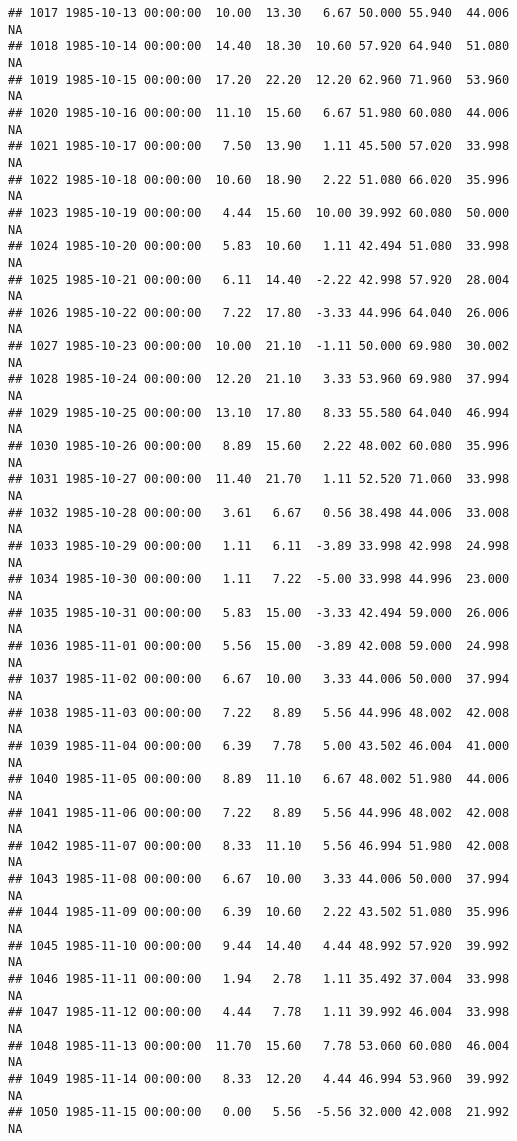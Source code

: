 \documentclass{article}\usepackage{graphicx, color}
\makeatletter
\newenvironment{kframe}{%
 \def\at@end@of@kframe{}%
 \ifinner\ifhmode%
  \def\at@end@of@kframe{\end{minipage}}%
  \begin{minipage}{\columnwidth}%
 \fi\fi%
 \def\FrameCommand##1{\hskip\@totalleftmargin \hskip-\fboxsep
 \colorbox{shadecolor}{##1}\hskip-\fboxsep
     \hskip-\linewidth \hskip-\@totalleftmargin \hskip\columnwidth}%
 \MakeFramed {\advance\hsize-\width
   \@totalleftmargin\z@ \linewidth\hsize
   \@setminipage}}%
 {\par\unskip\endMakeFramed%
 \at@end@of@kframe}
\newenvironment{knitrout}{}{} %
\makeatother
\begin{document}
\begin{knitrout}
\begin{kframe}
\begin{verbatim}
## 1017 1985-10-13 00:00:00  10.00  13.30   6.67 50.000 55.940  44.006     NA
## 1018 1985-10-14 00:00:00  14.40  18.30  10.60 57.920 64.940  51.080     NA
## 1019 1985-10-15 00:00:00  17.20  22.20  12.20 62.960 71.960  53.960     NA
## 1020 1985-10-16 00:00:00  11.10  15.60   6.67 51.980 60.080  44.006     NA
## 1021 1985-10-17 00:00:00   7.50  13.90   1.11 45.500 57.020  33.998     NA
## 1022 1985-10-18 00:00:00  10.60  18.90   2.22 51.080 66.020  35.996     NA
## 1023 1985-10-19 00:00:00   4.44  15.60  10.00 39.992 60.080  50.000     NA
## 1024 1985-10-20 00:00:00   5.83  10.60   1.11 42.494 51.080  33.998     NA
## 1025 1985-10-21 00:00:00   6.11  14.40  -2.22 42.998 57.920  28.004     NA
## 1026 1985-10-22 00:00:00   7.22  17.80  -3.33 44.996 64.040  26.006     NA
## 1027 1985-10-23 00:00:00  10.00  21.10  -1.11 50.000 69.980  30.002     NA
## 1028 1985-10-24 00:00:00  12.20  21.10   3.33 53.960 69.980  37.994     NA
## 1029 1985-10-25 00:00:00  13.10  17.80   8.33 55.580 64.040  46.994     NA
## 1030 1985-10-26 00:00:00   8.89  15.60   2.22 48.002 60.080  35.996     NA
## 1031 1985-10-27 00:00:00  11.40  21.70   1.11 52.520 71.060  33.998     NA
## 1032 1985-10-28 00:00:00   3.61   6.67   0.56 38.498 44.006  33.008     NA
## 1033 1985-10-29 00:00:00   1.11   6.11  -3.89 33.998 42.998  24.998     NA
## 1034 1985-10-30 00:00:00   1.11   7.22  -5.00 33.998 44.996  23.000     NA
## 1035 1985-10-31 00:00:00   5.83  15.00  -3.33 42.494 59.000  26.006     NA
## 1036 1985-11-01 00:00:00   5.56  15.00  -3.89 42.008 59.000  24.998     NA
## 1037 1985-11-02 00:00:00   6.67  10.00   3.33 44.006 50.000  37.994     NA
## 1038 1985-11-03 00:00:00   7.22   8.89   5.56 44.996 48.002  42.008     NA
## 1039 1985-11-04 00:00:00   6.39   7.78   5.00 43.502 46.004  41.000     NA
## 1040 1985-11-05 00:00:00   8.89  11.10   6.67 48.002 51.980  44.006     NA
## 1041 1985-11-06 00:00:00   7.22   8.89   5.56 44.996 48.002  42.008     NA
## 1042 1985-11-07 00:00:00   8.33  11.10   5.56 46.994 51.980  42.008     NA
## 1043 1985-11-08 00:00:00   6.67  10.00   3.33 44.006 50.000  37.994     NA
## 1044 1985-11-09 00:00:00   6.39  10.60   2.22 43.502 51.080  35.996     NA
## 1045 1985-11-10 00:00:00   9.44  14.40   4.44 48.992 57.920  39.992     NA
## 1046 1985-11-11 00:00:00   1.94   2.78   1.11 35.492 37.004  33.998     NA
## 1047 1985-11-12 00:00:00   4.44   7.78   1.11 39.992 46.004  33.998     NA
## 1048 1985-11-13 00:00:00  11.70  15.60   7.78 53.060 60.080  46.004     NA
## 1049 1985-11-14 00:00:00   8.33  12.20   4.44 46.994 53.960  39.992     NA
## 1050 1985-11-15 00:00:00   0.00   5.56  -5.56 32.000 42.008  21.992     NA

\end{verbatim}
\end{kframe}
\end{knitrout}
\end{document}
